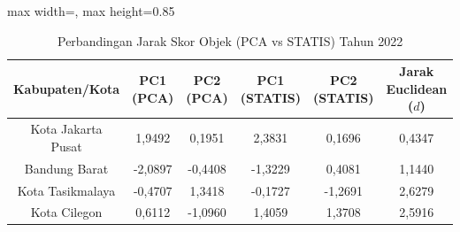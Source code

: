\begin{table}[H]
\centering
\caption{Perbandingan Jarak Skor Objek (PCA vs STATIS) Tahun 2022} \label{tab:sample2jarak_skor_2022}
\begin{adjustbox}{max width=\textwidth, max height=0.85\textheight}
\begin{tabular}{|c|c|c|c|c|c|}
\hline
\textbf{Kabupaten/Kota} & \textbf{PC1 (PCA)} & \textbf{PC2 (PCA)} & \textbf{PC1 (STATIS)} & \textbf{PC2 (STATIS)} & \textbf{Jarak Euclidean ($d$)} \\
\hline
Kota Jakarta Pusat & 1,9492 & 0,1951 & 2,3831 & 0,1696 & 0,4347 \\
Bandung Barat & -2,0897 & -0,4408 & -1,3229 & 0,4081 & 1,1440 \\
Kota Tasikmalaya & -0,4707 & 1,3418 & -0,1727 & -1,2691 & 2,6279 \\
Kota Cilegon & 0,6112 & -1,0960 & 1,4059 & 1,3708 & 2,5916 \\
\hline
\end{tabular}
\end{adjustbox}
\end{table}